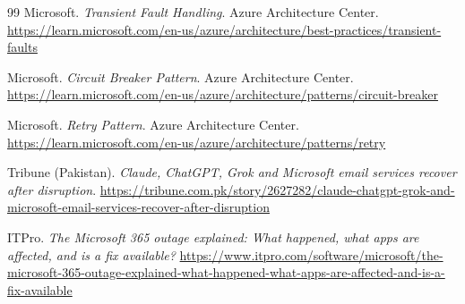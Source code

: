 \documentclass[11pt,a4paper]{article}
\begin{document}
\begin{thebibliography}{99}
Microsoft. \emph{Transient Fault Handling}. Azure Architecture Center. \url{https://learn.microsoft.com/en-us/azure/architecture/best-practices/transient-faults}

Microsoft. \emph{Circuit Breaker Pattern}. Azure Architecture Center. \url{https://learn.microsoft.com/en-us/azure/architecture/patterns/circuit-breaker}

Microsoft. \emph{Retry Pattern}. Azure Architecture Center. \url{https://learn.microsoft.com/en-us/azure/architecture/patterns/retry}

Tribune (Pakistan). \emph{Claude, ChatGPT, Grok and Microsoft email services recover after disruption}. \url{https://tribune.com.pk/story/2627282/claude-chatgpt-grok-and-microsoft-email-services-recover-after-disruption}

ITPro. \emph{The Microsoft 365 outage explained: What happened, what apps are affected, and is a fix available?} \url{https://www.itpro.com/software/microsoft/the-microsoft-365-outage-explained-what-happened-what-apps-are-affected-and-is-a-fix-available}
\end{thebibliography}
\end{document}

